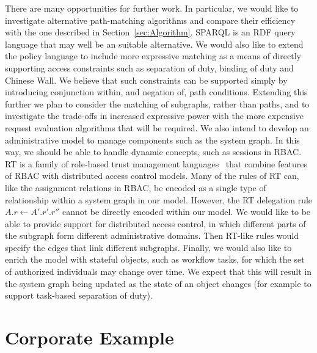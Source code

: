 \documentclass{article}
\begin{document}
There are many opportunities for further work.
In particular, we would like to investigate alternative path-matching algorithms and compare their efficiency with the one described in Section~\ref{sec:Algorithm}.
SPARQL is an RDF query language that may well be an suitable alternative.
We would also like to extend the policy language to include more expressive matching as a means of directly supporting access constraints such as separation of duty, binding of duty and Chinese Wall.
We believe that such constraints can be supported simply by introducing conjunction within, and negation of, path conditions.
Extending this further we plan to consider the matching of subgraphs, rather than paths, and to investigate the trade-offs in increased expressive power with the more expensive request evaluation algorithms that will be required.
We also intend to develop an administrative model to manage components such as the system graph.
In this way, we should be able to handle dynamic concepts, such as sessions in RBAC.
RT is a family of role-based trust management languages~\cite{LiMiWi02} that combine features of RBAC with distributed access control models.
Many of the rules of RT can, like the assignment relations in RBAC, be encoded as a single type of relationship within a system graph in our model.
However, the RT delegation rule $A.r \leftarrow A'.r'.r''$ cannot be directly encoded within our model.
We would like to be able to provide support for distributed access control, in which different parts of the subgraph form different administrative domains.
Then RT-like rules would specify the edges that link different subgraphs.
Finally, we would also like to enrich the model with stateful objects, such as workflow tasks, for which the set of authorized individuals may change over time.
We expect that this will result in the system graph being updated as the state of an object changes (for example to support task-based separation of duty).





\clearpage

\appendix
\section{Corporate Example}\label{appendix:section:example}
\end{document}
